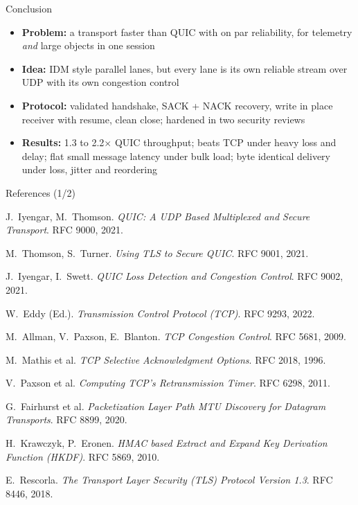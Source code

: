 \documentclass[aspectratio=169,11pt]{beamer}
\begin{document}
\begin{frame}{Conclusion}
  \begin{itemize}
    \item \textbf{Problem:} a transport faster than QUIC with on par reliability, for telemetry \emph{and}
          large objects in one session
    \item \textbf{Idea:} IDM style parallel lanes, but every lane is its own reliable stream over UDP with its
          own congestion control
    \item \textbf{Protocol:} validated handshake, SACK + NACK recovery, write in place receiver with resume,
          clean close; hardened in two security reviews
    \item \textbf{Results:} 1.3 to 2.2$\times$ QUIC throughput; beats TCP under heavy loss and delay; flat small message latency under bulk load;
          byte identical delivery under loss, jitter and reordering
  \end{itemize}
  \vspace{6mm}
\end{frame}

\begin{frame}{References (1/2)}
  \scriptsize
  \begin{enumerate}[{[}1{]}]\setlength{\itemsep}{1pt}
    \item J.~Iyengar, M.~Thomson. \emph{QUIC: A UDP Based Multiplexed and Secure Transport}. RFC 9000, 2021.
    \item M.~Thomson, S.~Turner. \emph{Using TLS to Secure QUIC}. RFC 9001, 2021.
    \item J.~Iyengar, I.~Swett. \emph{QUIC Loss Detection and Congestion Control}. RFC 9002, 2021.
    \item W.~Eddy (Ed.). \emph{Transmission Control Protocol (TCP)}. RFC 9293, 2022.
    \item M.~Allman, V.~Paxson, E.~Blanton. \emph{TCP Congestion Control}. RFC 5681, 2009.
    \item M.~Mathis et al. \emph{TCP Selective Acknowledgment Options}. RFC 2018, 1996.
    \item V.~Paxson et al. \emph{Computing TCP's Retransmission Timer}. RFC 6298, 2011.
    \item G.~Fairhurst et al. \emph{Packetization Layer Path MTU Discovery for Datagram Transports}. RFC 8899, 2020.
    \item H.~Krawczyk, P.~Eronen. \emph{HMAC based Extract and Expand Key Derivation Function (HKDF)}. RFC 5869, 2010.
    \item E.~Rescorla. \emph{The Transport Layer Security (TLS) Protocol Version 1.3}. RFC 8446, 2018.
  \end{enumerate}
\end{frame}
\end{document}
